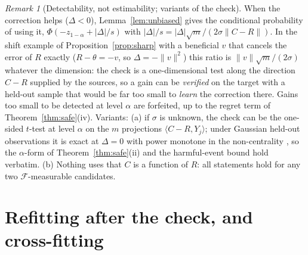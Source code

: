 \documentclass[10pt,a4paper]{article}
\theoremstyle{plain}
\theoremstyle{definition}
\theoremstyle{remark}
\newtheorem{remark}[theorem]{Remark}
\newcommand{\norm}[1]{\lVert #1\rVert}
\newcommand{\ip}[1]{\langle #1\rangle}
\begin{document}
\begin{remark}[Detectability, not estimability; variants of the check]\label{rem:power}
When the correction helps ($\Delta<0$), Lemma~\ref{lem:unbiased} gives the conditional probability of using it, $\Phi(-z_{1-\alpha}+|\Delta|/s)$ with $|\Delta|/s=|\Delta|\sqrt m/(2\sigma\norm{C-R})$. In the shift example of Proposition~\ref{prop:sharp} with a beneficial $v$ that cancels the error of $R$ exactly ($R-\theta=-v$, so $\Delta=-\norm v^2$) this ratio is $\norm v\sqrt m/(2\sigma)$ whatever the dimension: the check is a one-dimensional test along the direction $C-R$ supplied by the sources, so a gain can be \emph{verified} on the target with a held-out sample that would be far too small to \emph{learn} the correction there. Gains too small to be detected at level $\alpha$ are forfeited, up to the regret term of Theorem~\ref{thm:safe}(iv). Variants: (a) if $\sigma$ is unknown, the check can be the one-sided $t$-test at level $\alpha$ on the $m$ projections $\ip{C-R,Y_j}$; under Gaussian held-out observations it is exact at $\Delta=0$ with power monotone in the non-centrality \citep{lehmannromano2005}, so the $\alpha$-form of Theorem~\ref{thm:safe}(ii) and the harmful-event bound hold verbatim. (b) Nothing uses that $C$ is a function of $R$: all statements hold for any two $\mathcal F$-measurable candidates.
\end{remark}

\section{Refitting after the check, and cross-fitting}\label{sec:refit}
\end{document}
